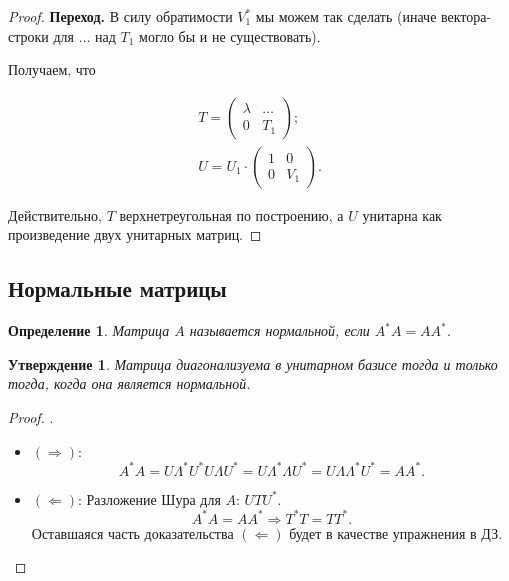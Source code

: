\documentclass[a4paper, 12pt]{article}
\newenvironment{induct}{\par\noindent\textbf{Переход.}}{\hfill}
\newtheorem{definition}{Определение}[section]
\newtheorem{assertion}{Утверждение}[section]
\begin{document}
\begin{proof}
\begin{induct}
        В силу обратимости $V_1^*$ мы можем так сделать (иначе вектора-строки
        для $\dots$ над $T_1$ могло бы и не существовать).

        Получаем, что

        \[
            \begin{array}{c}
                T = \begin{pmatrix}
                    \lambda & \dots \\
                    0 & T_1
                \end{pmatrix}; \\
                U = U_1 \cdot \begin{pmatrix}
                    1 & 0 \\
                    0 & V_1
                \end{pmatrix}.
            \end{array}
        \]

        Действительно, $T$ верхнетреугольная по построению, а $U$ унитарна как
        произведение двух унитарных матриц.
    \end{induct}
\end{proof}

\subsection{Нормальные матрицы}

\begin{definition}
    Матрица $A$ называется нормальной, если $A^* A = A A^*$.
\end{definition}

\begin{assertion}
    Матрица диагонализуема в унитарном базисе тогда и только тогда, когда она
    является нормальной.
\end{assertion}

\begin{proof}.

    \begin{itemize}
        \item $(\Rightarrow)$:
            \[
                A^* A = U \Lambda^* U^* U \Lambda U^* = U \Lambda^* \Lambda U^*
                = U \Lambda \Lambda^* U^* = A A^*.
            \]
        \item $(\Leftarrow)$: Разложение Шура для $A$: $U T U^*$.
            \[
                A^* A = A A^* \Rightarrow T^* T = T T^*.
            \]
            Оставшаяся часть доказательства $(\Leftarrow)$ будет в качестве
            упражнения в ДЗ.
    \end{itemize}
\end{proof}
\end{document}
